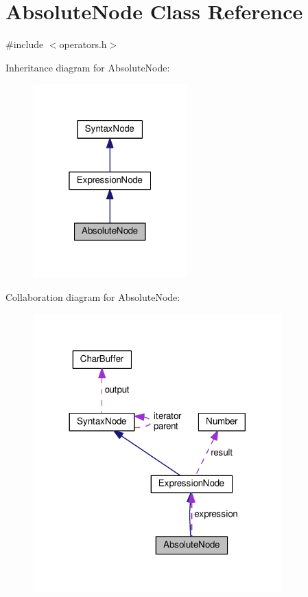 \hypertarget{classAbsoluteNode}{}\section{Absolute\+Node Class Reference}
\label{classAbsoluteNode}


{\ttfamily \#include $<$operators.\+h$>$}



Inheritance diagram for Absolute\+Node\+:\nopagebreak
\begin{figure}[H]
\begin{center}
\leavevmode
\includegraphics[width=169pt]{classAbsoluteNode__inherit__graph}
\end{center}
\end{figure}


Collaboration diagram for Absolute\+Node\+:\nopagebreak
\begin{figure}[H]
\begin{center}
\leavevmode
\includegraphics[width=272pt]{classAbsoluteNode__coll__graph}
\end{center}
\end{figure}
